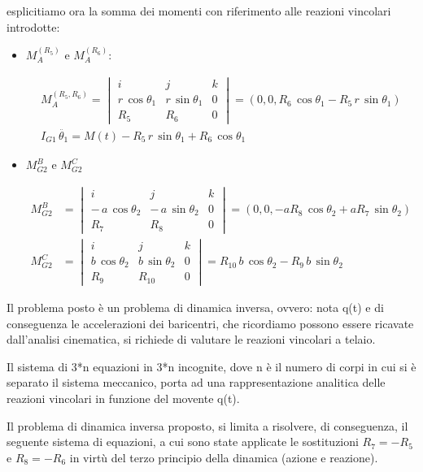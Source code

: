 esplicitiamo ora la somma dei momenti con riferimento alle reazioni vincolari introdotte:

\begin{itemize}
\item $M_A^{(R_5)}$ e $M_A^{(R_6)}$:

\begin{gather*}
	M_A^{(R_5,R_6)} = 
	\begin{vmatrix}
	i&j&k\\
	r\,\cos{\theta_1}&r\,\sin{\theta_1}&0\\
	R_5&R_6&0
	\end{vmatrix}
	= (0,0,R_6\,\cos{\theta_1} - R_5\,r\,\sin{\theta_1})\\
	I_{G1}\,\ddot{\theta_1} = M(t) - R_5\,r\,\sin{\theta_1} + R_6\,\cos{\theta_1}
\end{gather*}

\item $M_{G2}^{B}$ e $M_{G2}^{C}$

\begin{align*}
	M_{G2}^{B} &= 
	\begin{vmatrix}
		i&j&k\\
		-\,a\,\cos{\theta_2}&-\,a\,\sin{\theta_2}&0\\
		R_7&R_8&0
	\end{vmatrix}
	= (0,0, -aR_8\,\cos{\theta_2}+aR_7\,\sin{\theta_2})\\
	M_{G2}^{C} &= 
	\begin{vmatrix}
		i&j&k\\
		b\,\cos{\theta_2}&b\,\sin{\theta_2}&0\\
		R_9&R_{10}&0
	\end{vmatrix}
	= R_{10}\,b\,\cos{\theta_2} - R_9\,b\,\sin{\theta_2}
\end{align*}
\end{itemize}


Il problema posto è un problema di dinamica inversa, ovvero: nota q(t) e di conseguenza le accelerazioni dei baricentri, che ricordiamo possono essere ricavate dall'analisi cinematica, si richiede di valutare le reazioni vincolari a telaio.

Il sistema di 3*n equazioni in 3*n incognite, dove n è il numero di corpi in cui si è separato il sistema meccanico, porta ad una rappresentazione analitica delle reazioni vincolari in funzione del movente q(t).

Il problema di dinamica inversa proposto, si limita a risolvere, di conseguenza, il seguente sistema di equazioni, a cui sono state applicate le sostituzioni $R_7 = -R_5$ e $R_8= -R_6$ in virtù del terzo principio della dinamica (azione e reazione).

